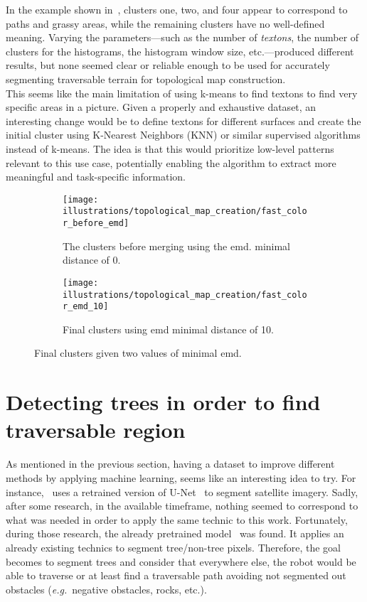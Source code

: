 In the example shown in~, clusters one, two, and four appear to correspond
to paths and grassy areas, while the remaining clusters have no well-defined meaning.
Varying the parameters---such as the number of \textit{textons}, the number of clusters for the histograms, the histogram
window size, etc.---produced different results, but none seemed clear or reliable enough to be used for accurately segmenting
traversable terrain for topological map construction.\\
This seems like the main limitation of using k-means to find textons to find very specific areas in a picture.
Given a properly and exhaustive dataset, an interesting change would be to define textons for different surfaces
and create the initial cluster using K-Nearest Neighbors (KNN) or similar supervised algorithms instead of k-means.
The idea is that this would prioritize low-level patterns relevant to this use case, potentially enabling the algorithm
to extract more meaningful and task-specific information.


\begin{figure}
    \begin{subfigure}[t]{0.45\textwidth}
        \texttt{[image: illustrations/topological\_map\_creation/fast\_color\_before\_emd]}
        \caption{The clusters before merging using the \gls{emd}. minimal distance of 0.}
        \label{fig:fast_color:before_emd}
    \end{subfigure}
    \hfill
    \begin{subfigure}[t]{0.45\textwidth}
        \texttt{[image: illustrations/topological\_map\_creation/fast\_color\_emd\_10]}
        \caption{Final clusters using \gls{emd} minimal distance of 10.}
        \label{fig:fast_color:emd_10}
    \end{subfigure}
    \hfill
    \caption{Final clusters given two values of minimal \gls{emd}.}
    \label{fig:fast_color:final_cluters_comparaison}
\end{figure}


\section{Detecting trees in order to find traversable region}

As mentioned in the previous section, having a dataset to improve different methods by applying machine learning, seems
like an interesting idea to try.
For instance,~\textcite{zhang_dual-bev_2025} uses a retrained version of U-Net~\cite{ronneberger_u-net_2015} to segment satellite imagery.
Sadly, after some research, in the available timeframe, nothing seemed to correspond to what was needed in order to
apply the same technic to this work.
Fortunately, during those research, the already pretrained model~\textcite{bosch_journal_2020} was found.
It applies an already existing technics to segment tree/non-tree pixels.
Therefore, the goal becomes to segment trees and consider that everywhere else, the robot would be able to traverse
or at least find a traversable path avoiding not segmented out obstacles (\textit{e.g.}\ negative obstacles, rocks, etc.).

